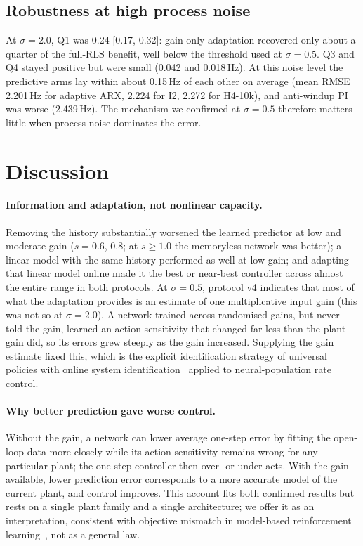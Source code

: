 \documentclass[11pt]{article}
\newcommand{\Hz}{\,Hz}
\begin{document}
\subsection{Robustness at high process noise}
At $\sigma=2.0$, Q1 was 0.24 [0.17, 0.32]: gain-only adaptation recovered only about a quarter of the full-RLS benefit, well below the threshold used at $\sigma=0.5$. Q3 and Q4 stayed positive but were small (0.042 and 0.018\Hz). At this noise level the predictive arms lay within about 0.15\Hz{} of each other on average (mean RMSE 2.201\Hz{} for adaptive ARX, 2.224 for I2, 2.272 for H4-10k), and anti-windup PI was worse (2.439\Hz). The mechanism we confirmed at $\sigma=0.5$ therefore matters little when process noise dominates the error.

\section{Discussion}
\paragraph{Information and adaptation, not nonlinear capacity.} Removing the history substantially worsened the learned predictor at low and moderate gain ($s=0.6$, $0.8$; at $s\ge1.0$ the memoryless network was better); a linear model with the same history performed as well at low gain; and adapting that linear model online made it the best or near-best controller across almost the entire range in both protocols. At $\sigma=0.5$, protocol v4 indicates that most of what the adaptation provides is an estimate of one multiplicative input gain (this was not so at $\sigma=2.0$). A network trained across randomised gains, but never told the gain, learned an action sensitivity that changed far less than the plant gain did, so its errors grew steeply as the gain increased. Supplying the gain estimate fixed this, which is the explicit identification strategy of universal policies with online system identification~\cite{yu2017} applied to neural-population rate control.

\paragraph{Why better prediction gave worse control.} Without the gain, a network can lower average one-step error by fitting the open-loop data more closely while its action sensitivity remains wrong for any particular plant; the one-step controller then over- or under-acts. With the gain available, lower prediction error corresponds to a more accurate model of the current plant, and control improves. This account fits both confirmed results but rests on a single plant family and a single architecture; we offer it as an interpretation, consistent with objective mismatch in model-based reinforcement learning~\cite{lambert2020,grimm2020}, not as a general law.
\end{document}
